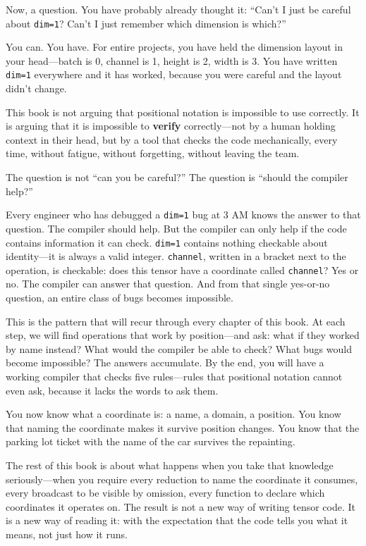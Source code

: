 \documentclass[11pt,titlepage]{article}
\begin{document}
Now, a question. You have probably already thought it: ``Can't I just be
careful about \texttt{dim=1}? Can't I just remember which dimension is
which?''

You can. You have. For entire projects, you have held the dimension
layout in your head---batch is 0, channel is 1, height is 2, width is 3.
You have written \texttt{dim=1} everywhere and it has worked, because
you were careful and the layout didn't change.

This book is not arguing that positional notation is impossible to use
correctly. It is arguing that it is impossible to \textbf{verify}
correctly---not by a human holding context in their head, but by a tool
that checks the code mechanically, every time, without fatigue, without
forgetting, without leaving the team.

The question is not ``can you be careful?'' The question is ``should the
compiler help?''

Every engineer who has debugged a \texttt{dim=1} bug at 3 AM knows the
answer to that question. The compiler should help. But the compiler can
only help if the code contains information it can check. \texttt{dim=1}
contains nothing checkable about identity---it is always a valid
integer. \texttt{channel}, written in a bracket next to the operation,
is checkable: does this tensor have a coordinate called
\texttt{channel}? Yes or no. The compiler can answer that question. And
from that single yes-or-no question, an entire class of bugs becomes
impossible.

This is the pattern that will recur through every chapter of this book.
At each step, we will find operations that work by position---and ask:
what if they worked by name instead? What would the compiler be able to
check? What bugs would become impossible? The answers accumulate. By the
end, you will have a working compiler that checks five rules---rules
that positional notation cannot even ask, because it lacks the words to
ask them.

You now know what a coordinate is: a name, a domain, a position. You
know that naming the coordinate makes it survive position changes. You
know that the parking lot ticket with the name of the car survives the
repainting.

The rest of this book is about what happens when you take that knowledge
seriously---when you require every reduction to name the coordinate it
consumes, every broadcast to be visible by omission, every function to
declare which coordinates it operates on. The result is not a new way of
writing tensor code. It is a new way of reading it: with the expectation
that the code tells you what it means, not just how it runs.
\end{document}
